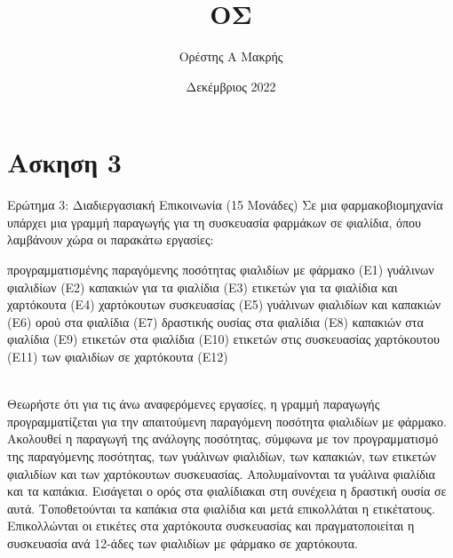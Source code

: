 \documentclass{article}
\title{ΟΣ}
\author{Ορέστης Α Μακρής}
\date{Δεκέμβριος 2022}
\begin{document}
\section{Ασκηση 3}
Ερώτημα 3: Διαδιεργασιακή Επικοινωνία (15 Μονάδες)
Σε μια φαρμακοβιομηχανία υπάρχει μια γραμμή παραγωγής για τη συσκευασία φαρμάκων σε φιαλίδια, όπου λαμβάνουν χώρα οι παρακάτω εργασίες: 
\\

 \begin{itemize}
  προγραμματισμένης παραγόμενης ποσότητας φιαλιδίων με φάρμακο (Ε1)
  γυάλινων φιαλιδίων (Ε2)
  καπακιών για τα φιαλίδια (Ε3)
  ετικετών για τα φιαλίδια και χαρτόκουτα (Ε4)
  χαρτόκουτων συσκευασίας (Ε5)
  γυάλινων φιαλιδίων και καπακιών (Ε6)
  ορού στα φιαλίδια (Ε7)
  δραστικής ουσίας στα φιαλίδια (Ε8)
  καπακιών στα φιαλίδια (Ε9)
  ετικετών στα φιαλίδια (Ε10)
  ετικετών στις συσκευασίας χαρτόκουτου (Ε11)
   των φιαλιδίων σε χαρτόκουτα (Ε12)
\end{itemize}
\\
Θεωρήστε ότι για τις άνω αναφερόμενες εργασίες, η γραμμή παραγωγής προγραμματίζεται για την απαιτούμενη
παραγόμενη ποσότητα φιαλιδίων με φάρμακο. Ακολουθεί η παραγωγή της ανάλογης ποσότητας, σύμφωνα με τον
προγραμματισμό της παραγόμενης ποσότητας, των γυάλινων φιαλιδίων, των καπακιών, των ετικετών φιαλιδίων και
των χαρτόκουτων συσκευασίας. Απολυμαίνονται τα γυάλινα φιαλίδια και τα καπάκια. Εισάγεται ο ορός στα φιαλίδιακαι στη συνέχεια η δραστική ουσία σε αυτά. Τοποθετούνται τα καπάκια στα φιαλίδια και μετά επικολλάται η ετικέτατους. Επικολλώνται οι ετικέτες στα χαρτόκουτα συσκευασίας και πραγματοποιείται η συσκευασία ανά 12-άδες των φιαλιδίων με φάρμακο σε χαρτόκουτα.
\\
\end{document}
